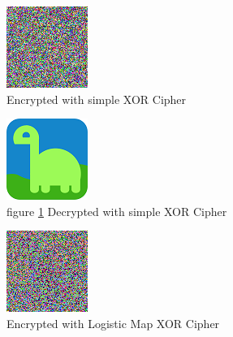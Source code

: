 \documentclass[10pt]{article}
\begin{document}
    \begin{figure}[htbp]
        \centering
        \includegraphics[width=0.5\columnwidth]{simpleDinoEncrypted.png}
        \caption{Encrypted with simple XOR Cipher}
        \label{fig2}
    \end{figure}

    
    \begin{figure}[htbp]
        \centering
        \includegraphics[width=0.5\columnwidth]{simpleDinoDecrypted.png}
        \caption{figure \ref{fig2} Decrypted with simple XOR Cipher}
        \label{fig3}
    \end{figure}



    \begin{figure}[htbp]
        \centering
        \includegraphics[width=0.5\columnwidth]{LMapStreamDinoEncrypted.png}
        \caption{Encrypted with Logistic Map XOR Cipher}
        \label{fig4}
    \end{figure}
\end{document}
